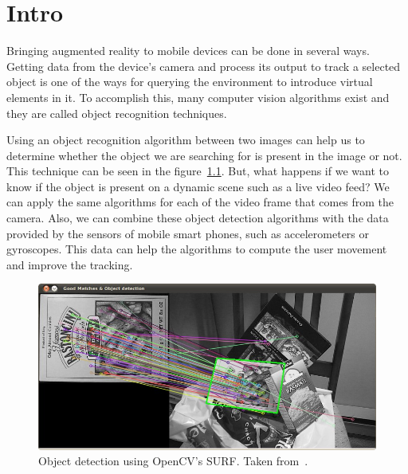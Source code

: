 \chapter{Intro}

Bringing augmented reality to mobile devices can be done in several ways. Getting
data from the device's camera and process its output to track a selected object is
one of the ways for querying the environment to introduce virtual elements in it. To
accomplish this, many computer vision algorithms exist and they are called object
recognition techniques.  

Using an object recognition algorithm between two images can help us to
determine whether the object we are searching for is present in the image or
not. This technique can be seen in the figure~\ref{fig:introdetect}. But, what happens if
we want to know if the object is present on a dynamic scene such as a
live video feed? We can apply the same algorithms for each of the video frame
that comes from the camera. 
Also, we can combine these object detection algorithms with the data provided
by the sensors of mobile smart phones, such as accelerometers or
gyroscopes. This data can help the algorithms to compute the user movement and
improve the tracking.

\begin{figure}
\centering
\includegraphics[scale=0.45]{img/intro-feature.jpg}
\caption{\label{fig:introdetect} Object detection using OpenCV's SURF. Taken
  from~\cite{opencvhomography}.} 
\end{figure} 

